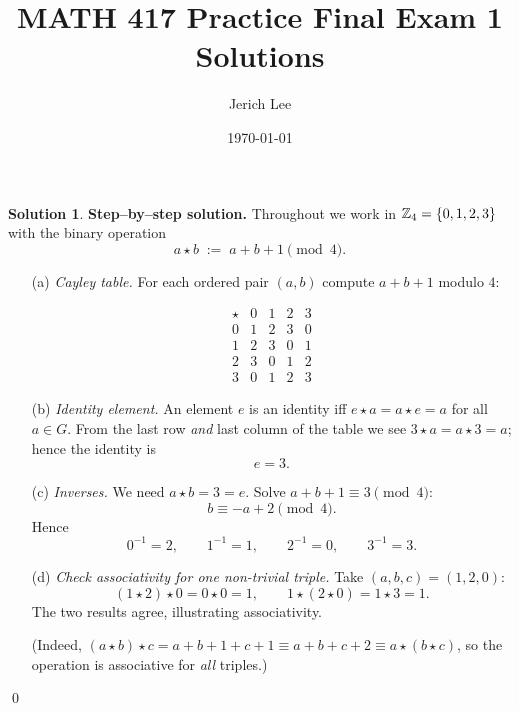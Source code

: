 \documentclass[12pt]{article}
\title{MATH 417 Practice Final Exam 1 Solutions}
\author{Jerich Lee}
\date{\today}
\theoremstyle{definition} %
\newtheorem{solution}{Solution}
\theoremstyle{plain} %
\begin{document}
\maketitle
\begin{solution}
  \textbf{Step--by--step solution.}  
  Throughout we work in $\Bbb Z_{4}=\{0,1,2,3\}$ with the binary operation  
  \[
     a\star b \;:=\; a+b+1 \pmod{4}.
  \]
  
  \begin{enumerate}
      \item[(a)] \emph{Cayley table.}  For each ordered pair $(a,b)$ compute
            $a+b+1$ modulo $4$:
  
            \[
            \renewcommand{\arraystretch}{1.2}
            \begin{array}{c|cccc}
                \star & 0 & 1 & 2 & 3\\\hline
                0 & 1 & 2 & 3 & 0\\
                1 & 2 & 3 & 0 & 1\\
                2 & 3 & 0 & 1 & 2\\
                3 & 0 & 1 & 2 & 3
            \end{array}
            \]
  
      \item[(b)] \emph{Identity element.}  
            An element $e$ is an identity iff $e\star a=a\star e=a$ for all
            $a\in G$.  
            From the last row \emph{and} last column of the table we see
            $3\star a=a\star 3=a$; hence the identity is
            \[
                 e=3.
            \]
  
      \item[(c)] \emph{Inverses.}  
            We need $a\star b=3=e$.  Solve $a+b+1\equiv 3\pmod 4$:
            \[
                b\equiv -a+2 \pmod 4.
            \]
            Hence
            \[
                0^{-1}=2,\qquad
                1^{-1}=1,\qquad
                2^{-1}=0,\qquad
                3^{-1}=3.
            \]
  
      \item[(d)] \emph{Check associativity for one non-trivial triple.}  
            Take $(a,b,c)=(1,2,0)$:
            \[
                (1\star 2)\star 0
                = 0 \star 0        %
                = 1,
                \qquad
                1\star(2\star 0)
                = 1\star 3          %
                = 1.
            \]
            The two results agree, illustrating associativity.
  
            (Indeed, \((a\star b)\star c = a+b+1+c+1
            \equiv a+b+c+2 \equiv a\star(b\star c)\), so the operation is
            associative for \emph{all} triples.)
  \end{enumerate}\qed
  \end{solution}
\end{document}
